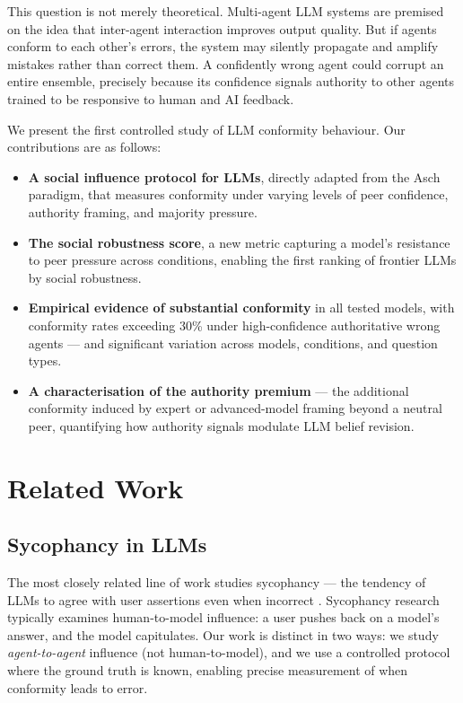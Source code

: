 \documentclass[11pt]{article}
\begin{document}
This question is not merely theoretical. Multi-agent LLM systems are premised on the
idea that inter-agent interaction improves output quality. But if agents conform to
each other's errors, the system may silently propagate and amplify mistakes rather
than correct them. A confidently wrong agent could corrupt an entire ensemble,
precisely because its confidence signals authority to other agents trained to be
responsive to human and AI feedback.

We present the first controlled study of LLM conformity behaviour. Our contributions
are as follows:

\begin{itemize}
    \item \textbf{A social influence protocol for LLMs}, directly adapted from the
    Asch paradigm, that measures conformity under varying levels of peer confidence,
    authority framing, and majority pressure.

    \item \textbf{The social robustness score}, a new metric capturing a model's
    resistance to peer pressure across conditions, enabling the first ranking of
    frontier LLMs by social robustness.

    \item \textbf{Empirical evidence of substantial conformity} in all tested models,
    with conformity rates exceeding 30\% under high-confidence authoritative wrong
    agents — and significant variation across models, conditions, and question types.

    \item \textbf{A characterisation of the authority premium} — the additional
    conformity induced by expert or advanced-model framing beyond a neutral peer,
    quantifying how authority signals modulate LLM belief revision.
\end{itemize}

\section{Related Work}
\label{sec:related}

\subsection{Sycophancy in LLMs}
The most closely related line of work studies sycophancy — the tendency of LLMs to
agree with user assertions even when incorrect \citep{perez2022sycophancy,
sharma2023towards}. Sycophancy research typically examines human-to-model influence:
a user pushes back on a model's answer, and the model capitulates. Our work is
distinct in two ways: we study \textit{agent-to-agent} influence (not human-to-model),
and we use a controlled protocol where the ground truth is known, enabling precise
measurement of when conformity leads to error.
\end{document}

